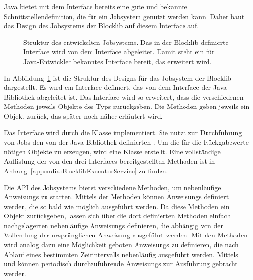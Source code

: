 Java bietet mit dem Interface  bereits eine gute und bekannte Schnittstellendefinition, die für ein Jobsystem genutzt werden kann. Daher baut das Design des Jobsystems der Blocklib auf diesem Interface auf. 

\begin{figure}
	
	\caption[Struktur des entwickelten Jobsystems.]{Struktur des entwickelten Jobsystems. Das in der Blocklib definierte Interface wird von dem Interface  abgeleitet. Damit steht ein für Java-Entwickler bekanntes Interface bereit, das erweitert wird.}\label{fig:GrobesDesign}
\end{figure}

In Abbildung~\ref{fig:GrobesDesign} ist die Struktur des Designs für das Jobsystem der Blocklib dargestellt. Es wird ein Interface  definiert, das von dem Interface  der Java Bibliothek abgeleitet ist. Das Interface wird so erweitert, dass die verschiedenen  Methoden jeweils Objekte des Typs  zurückgeben. Die  Methoden geben jeweils ein  Objekt zurück, das später noch näher erläutert wird.

Das Interface  wird durch die Klasse  implementiert. Sie nutzt zur Durchführung von Jobs den von der Java Bibliothek definierten . Um die für die Rückgabewerte nötigen  Objekte zu erzeugen, wird eine Klasse  erstellt. Eine vollständige Auflistung der von den drei Interfaces bereitgestellten Methoden ist in Anhang~\ref{appendix:BlocklibExecutorService} zu finden. 

Die API des Jobsystems bietet verschiedene Methoden, um nebenläufige \glspl{Anweisung} zu starten. Mittels der  Methoden können \glspl{Anweisung} definiert werden, die so bald wie möglich ausgeführt werden. Da diese Methoden ein  Objekt zurückgeben, lassen sich über die dort definierten Methoden einfach nachgelagerten nebenläufige \glspl{Anweisung} definieren, die abhängig von der Vollendung der ursprünglichen \gls{Anweisung} ausgeführt werden. Mit den  Methoden wird analog dazu eine Möglichkeit geboten \glspl{Anweisung} zu definieren, die nach Ablauf eines bestimmten Zeitintervalls nebenläufig ausgeführt werden. Mittels  und  können periodisch durchzuführende \glspl{Anweisung} zur Ausführung gebracht werden.